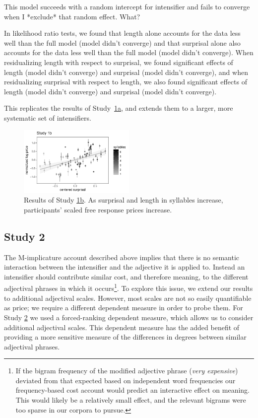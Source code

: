 \documentclass[10pt,letterpaper]{article}
\newcommand{\w}[1]{\emph{#1}}
\newcommand{\todo}[1]{{\color{red}#1}}
\begin{document}
\todo{This model succeeds with a random intercept for intensifier and fails to converge when I *exclude* that random effect. What?}

In likelihood ratio tests, we found that length alone accounts for the data less well than the full model (\todo{model didn't converge}) and that surprisal alone also accounts for the data less well than the full model (\todo{model didn't converge}). When residualizing length with respect to surprisal, we found significant effects of length (\todo{model didn't converge}) and surprisal (\todo{model didn't converge}), and when residualizing surprisal with respect to length, we also found significant effects of length (\todo{model didn't converge}) and surprisal (\todo{model didn't converge}).

This replicates the results of Study~\hyperref[sec:study1a]{1a}, and extends them to a larger, more systematic set of intensifiers.

\begin{figure}[ht]
\begin{center}
\includegraphics[width=0.5\textwidth]{images/plot_study1b.pdf}
\end{center}
\caption{Results of Study \hyperref[sec:study1b]{1b}. As surprisal and length in syllables increase, participants' scaled free response prices increase.} 
\label{fig:plot_study1b}
\end{figure}

\subsection{Study 2 \label{sec:study2}}

The M-implicature account described above implies that there is no semantic interaction between the intensifier and the adjective it is applied to.
Instead an intensifier should contribute similar cost, and therefore meaning, to the different adjectival phrases in which it occurs\footnote{If the bigram frequency of the modified adjective phrase (\w{very expensive}) deviated from that expected based on independent word frequencies our frequency-based cost account would predict an interactive effect on meaning.
This would likely be a relatively small effect, and the relevant bigrams were too sparse in our corpora to pursue.}.
To explore this issue, we extend our results to additional adjectival scales.
However, most scales are not so easily quantifiable as price; we require a different dependent measure in order to probe them.
For Study \hyperref[sec:study2]{2} we used a forced-ranking dependent measure, which allows us to consider additional adjectival scales.
This dependent measure has the added benefit of providing a more sensitive measure of the differences in degrees between similar adjectival phrases.
\end{document}
